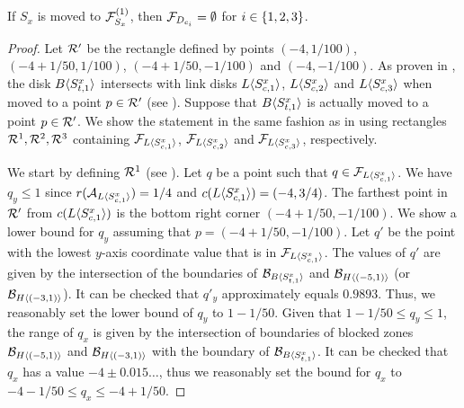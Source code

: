 \begin{toappendix}
\begin{toappendix}
\begin{mlemmarep}\label{lem:feasible_areas_blocked}
    If $S_x$ is moved to $\mathcal{F}_{S_x}^{(1)}$, then $\mathcal{F}_{D_{c_i}} = \emptyset$ for $i \in \{1,2,3\}$.
\end{mlemmarep}
\begin{proof}
    Let $\mathcal{R}'$ be the rectangle defined by points $(-4,1/100)$, $(-4+1/50,1/100)$, $(-4+1/50,-1/100)$ and $(-4,-1/100)$.
    As proven in , the disk $B\langle S_{t,1}^x\rangle$ intersects with link disks $L\langle S^x_{c,1}\rangle$, $L\langle S^x_{c,2}\rangle$ and $L\langle S^x_{c,3}\rangle$ when moved to a point $p \in \mathcal{R}'$ (see ).
    Suppose that $B\langle S_{t,1}^x\rangle$ is actually moved to a point $p \in \mathcal{R}'$.
    We show the statement in the same fashion as in  using rectangles $\mathcal{R}^1,\mathcal{R}^2,\mathcal{R}^3$ containing $\mathcal{F}_{L\langle S^x_{c,1}\rangle}$, $\mathcal{F}_{L\langle S^x_{c,2}\rangle}$ and $\mathcal{F}_{L\langle S^x_{c,3}\rangle}$, respectively.
    
    We start by defining $\mathcal{R}^1$ (see ).
    Let $q$ be a point such that $q \in \mathcal{F}_{L\langle S^x_{c,1}\rangle}$.
    We have $q_y \le 1$ since $r(\mathcal{A}_{L\langle S^x_{c,1}\rangle}) = 1/4$ and $c(L\langle S^x_{c,1}\rangle) = (-4,3/4)$.
    The farthest point in $\mathcal{R}'$ from $c(L\langle S^x_{c,1}\rangle)$ is the bottom right corner $(-4+1/50,-1/100)$.
    We show a lower bound for $q_y$ assuming that $p = (-4+1/50,-1/100)$.
    Let $q'$ be the point with the lowest $y$-axis coordinate value that is in $\mathcal{F}_{L\langle S^x_{c,1}\rangle}$. 
    The values of $q'$ are given by the intersection of the boundaries of $\mathcal{B}_{B\langle S_{t,1}^x\rangle}$ and $\mathcal{B}_{H\langle (-5,1)\rangle}$ (or $\mathcal{B}_{H\langle (-3,1)\rangle}$).
    It can be checked that $q'_y$ approximately equals $0.9893$. Thus, we reasonably set the lower bound of $q_y$ to $1-1/50$.
    Given that $1-1/50 \le q_y\le 1$, the range of $q_x$ is given by the intersection of boundaries of blocked zones $\mathcal{B}_{H\langle (-5,1)\rangle}$ and $\mathcal{B}_{H\langle (-3,1)\rangle}$ with the boundary of $\mathcal{B}_{B\langle S_{t,1}^x\rangle}$.
    It can be checked that $q_x$ has a value $-4\pm 0.015\dots$, thus we reasonably set the bound for $q_x$ to $-4 - 1/50 \le q_x \le -4+1/50$.


\end{proof}
\end{toappendix}
\end{toappendix}
